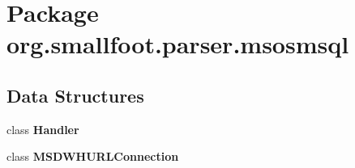 \section{Package org.\+smallfoot.\+parser.\+msosmsql}
\label{namespaceorg_1_1smallfoot_1_1parser_1_1msosmsql}
\subsection*{Data Structures}
\begin{DoxyCompactItemize}
\item 
class {\bf Handler}
\item 
class {\bf M\+S\+D\+W\+H\+U\+R\+L\+Connection}
\end{DoxyCompactItemize}
